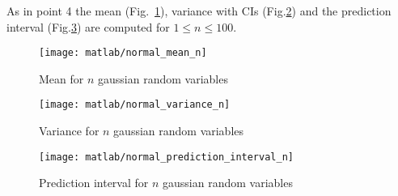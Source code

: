 \documentclass{article}
\begin{document}
As in point 4 the mean (Fig.~\ref{gaussian_mean_n}), variance with
CIs (Fig.\ref{gaussian_var_n}) and the prediction interval
(Fig.\ref{gaussian_pred_int_n}) are computed for $1 \leq n \leq 100$.
\begin{figure}[htbp]
  \centering
  \texttt{[image: matlab/normal\_mean\_n]}
  \caption{Mean for $n$ gaussian random variables}
  \label{gaussian_mean_n}
\end{figure}
\begin{figure}[htbp]
  \centering
  \texttt{[image: matlab/normal\_variance\_n]}
  \caption{Variance for $n$ gaussian random variables}
  \label{gaussian_var_n}
\end{figure}
\begin{figure}[htbp]
  \centering
  \texttt{[image: matlab/normal\_prediction\_interval\_n]}
  \caption{Prediction interval for $n$ gaussian random variables}
  \label{gaussian_pred_int_n}
\end{figure}
\end{document}
